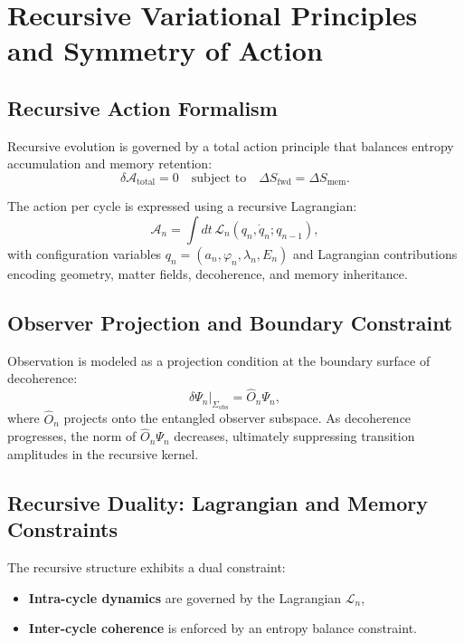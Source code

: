 \section{Recursive Variational Principles and Symmetry of Action}
\label{sec:recursive-variational-symmetry}

\subsection{Recursive Action Formalism}

Recursive evolution is governed by a total action principle that balances entropy accumulation and memory retention:
\begin{equation}
\delta \mathcal{A}_{\text{total}} = 0 \quad \text{subject to} \quad \Delta S_{\text{fwd}} = \Delta S_{\text{mem}}.
\end{equation}

The action per cycle is expressed using a recursive Lagrangian:
\begin{equation}
\mathcal{A}_n = \int dt \, \mathcal{L}_n(q_n, \dot{q}_n; q_{n-1}),
\end{equation}
with configuration variables \( q_n = (a_n, \varphi_n, \lambda_n, E_n) \) and Lagrangian contributions encoding geometry, matter fields, decoherence, and memory inheritance.

\subsection{Observer Projection and Boundary Constraint}

Observation is modeled as a projection condition at the boundary surface of decoherence:
\begin{equation}
\delta \Psi_n \big|_{\Sigma_{\text{obs}}} = \hat{O}_n \Psi_n,
\end{equation}
where \( \hat{O}_n \) projects onto the entangled observer subspace. As decoherence progresses, the norm of \( \hat{O}_n \Psi_n \) decreases, ultimately suppressing transition amplitudes in the recursive kernel.

\subsection{Recursive Duality: Lagrangian and Memory Constraints}

The recursive structure exhibits a dual constraint:

\begin{itemize}
    \item \textbf{Intra-cycle dynamics} are governed by the Lagrangian \( \mathcal{L}_n \),
    \item \textbf{Inter-cycle coherence} is enforced by an entropy balance constraint.
\end{itemize}


